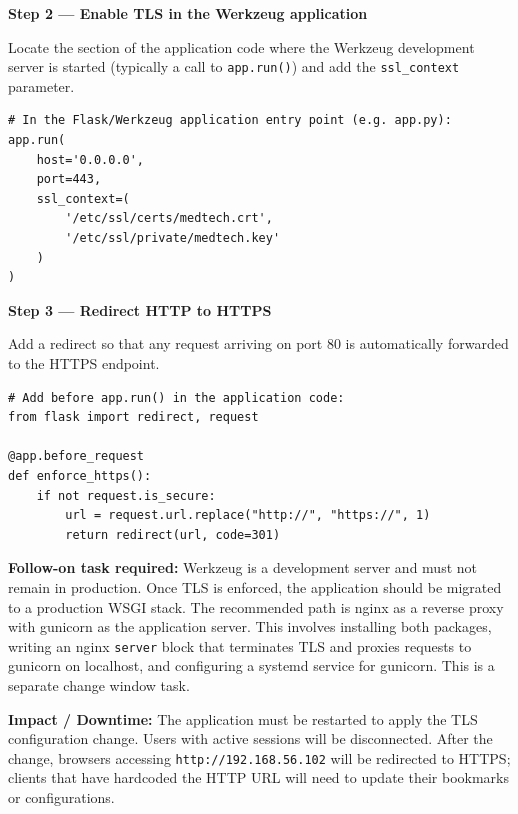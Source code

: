 \documentclass[12pt]{article}
\begin{document}
\bigskip
\noindent\textbf{Step 2 --- Enable TLS in the Werkzeug application}
 
Locate the section of the application code where the Werkzeug development
server is started (typically a call to \texttt{app.run()}) and add the
\texttt{ssl\_context} parameter.
 
\begin{lstlisting}[style=terminal]
# In the Flask/Werkzeug application entry point (e.g. app.py):
app.run(
    host='0.0.0.0',
    port=443,
    ssl_context=(
        '/etc/ssl/certs/medtech.crt',
        '/etc/ssl/private/medtech.key'
    )
)
\end{lstlisting}
 
\bigskip
\noindent\textbf{Step 3 --- Redirect HTTP to HTTPS}
 
Add a redirect so that any request arriving on port 80 is automatically
forwarded to the HTTPS endpoint.
 
\begin{lstlisting}[style=terminal]
# Add before app.run() in the application code:
from flask import redirect, request
 
@app.before_request
def enforce_https():
    if not request.is_secure:
        url = request.url.replace("http://", "https://", 1)
        return redirect(url, code=301)
\end{lstlisting}
 
\begin{warnbox}
\textbf{Follow-on task required:} Werkzeug is a development server and must
not remain in production. Once TLS is enforced, the application should be
migrated to a production WSGI stack. The recommended path is nginx as a
reverse proxy with gunicorn as the application server. This involves
installing both packages, writing an nginx \texttt{server} block that
terminates TLS and proxies requests to gunicorn on localhost, and configuring
a systemd service for gunicorn. This is a separate change window task.
\end{warnbox}
 
\bigskip
 
\begin{impactbox}
\textbf{Impact / Downtime:} The application must be restarted to apply the
TLS configuration change. Users with active sessions will be disconnected.
After the change, browsers accessing \texttt{http://192.168.56.102} will be
redirected to HTTPS; clients that have hardcoded the HTTP URL will need to
update their bookmarks or configurations.
\end{impactbox}
 
\end{document}
